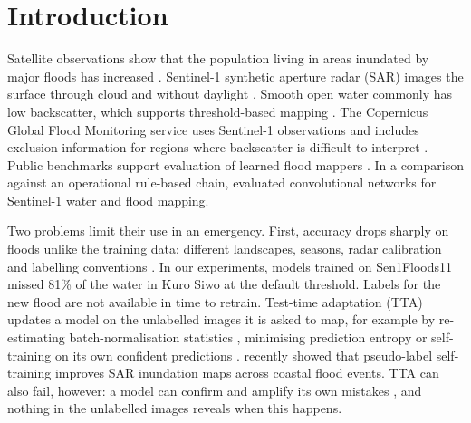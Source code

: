 \documentclass[a4paper,fleqn]{cas-sc}
\begin{document}
\maketitle
{}

\section{Introduction}
\label{sec:intro}

Satellite observations show that the population living in areas inundated by major floods has increased \citep{tellman2021exposure}. Sentinel-1 synthetic aperture radar (SAR) images the surface through cloud and without daylight \citep{torres2012sentinel1}. Smooth open water commonly has low backscatter, which supports threshold-based mapping \citep{twele2016s1chain}. The Copernicus Global Flood Monitoring service uses Sentinel-1 observations and includes exclusion information for regions where backscatter is difficult to interpret \citep{salamon2021gfm,zhao2021exclusion}. Public benchmarks support evaluation of learned flood mappers \citep{bonafilia2020sen1floods11,bountos2024kurosiwo,montello2022mmflood}. In a comparison against an operational rule-based chain, \citet{helleis2022benchmark} evaluated convolutional networks for Sentinel-1 water and flood mapping.

Two problems limit their use in an emergency. First, accuracy drops sharply on floods unlike the training data: different landscapes, seasons, radar calibration and labelling conventions \citep{bentivoglio2022review,turkmenli2025dgflood}. In our experiments, models trained on Sen1Floods11 missed 81\% of the water in Kuro Siwo at the default threshold. Labels for the new flood are not available in time to retrain. Test-time adaptation (TTA) updates a model on the unlabelled images it is asked to map, for example by re-estimating batch-normalisation statistics \citep{li2018adabn,schneider2020covariate}, minimising prediction entropy \citep{wang2021tent} or self-training on its own confident predictions \citep{tarvainen2017meanteacher,wang2022cotta}. \citet{chen2026cimttda} recently showed that pseudo-label self-training improves SAR inundation maps across coastal flood events. TTA can also fail, however: a model can confirm and amplify its own mistakes \citep{niu2022eata,niu2023sar}, and nothing in the unlabelled images reveals when this happens.
\end{document}
